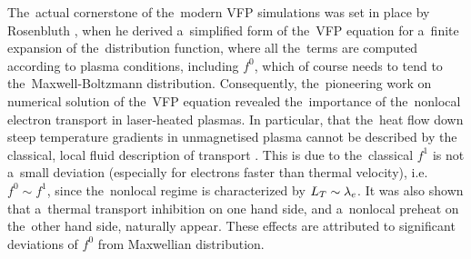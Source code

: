 
The~actual cornerstone of the~modern VFP simulations was set in place
by Rosenbluth \cite{Rosenbluth_PR1957}, when he derived a~simplified form 
of the~VFP equation for a~finite expansion of the~distribution function,
where all the~terms are computed according to plasma conditions, including
$f^0$, which of course needs to tend to the~Maxwell-Boltzmann distribution.
Consequently, the~pioneering work on numerical solution of the~VFP equation
\cite{Bell_1981_83, Matte_1982_86} revealed the~importance of the~nonlocal
electron transport in laser-heated plasmas. 
In particular, that the~heat flow down steep temperature gradients in 
unmagnetised plasma cannot be described by the classical, local fluid
description of transport \cite{SpitzerHarm_PR1953, Braginskii_1965_3}.
This is due to the~classical $f^1$ is not a~small deviation 
(especially for electrons faster than thermal velocity), i.e. $f^0\sim f^1$,
since the~nonlocal regime is characterized by $L_T\sim\lambda_e$.
It was also shown that a~thermal transport inhibition \cite{Bell_1981_83} 
on one hand side, and a~nonlocal preheat on the~other hand side, 
naturally appear. These effects are attributed to significant deviations 
of $f^0$ from Maxwellian distribution.



